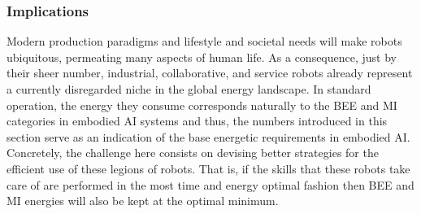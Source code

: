 \subsubsection{Implications}
Modern production paradigms and lifestyle and societal needs will make robots ubiquitous, permeating many aspects of human life. As a consequence, just by their sheer number, industrial, collaborative, and service robots already represent a currently disregarded niche in the global energy landscape. In standard operation, the energy they consume corresponds naturally to the BEE and MI categories in embodied AI systems and thus, the numbers introduced in this section serve as an indication of the base energetic requirements in embodied AI. Concretely, the challenge here consists on devising better strategies for the efficient use of these legions of robots. That is, if the skills that these robots take care of are performed in the most time and energy optimal fashion then BEE and MI energies will also be kept at the optimal minimum.
